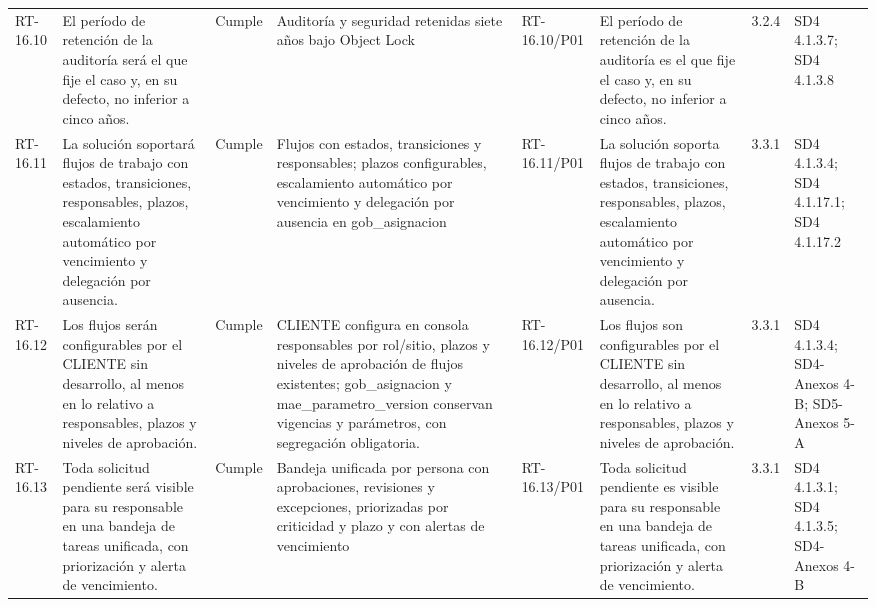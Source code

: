 \documentclass[oficio,firma,final]{lafrox}
\begin{document}
\begin{landscape}
{\begin{longtable}{@{}F{0.054} F{0.173} F{0.061} F{0.191} F{0.106} F{0.180} F{0.067} F{0.168}@{}}
  RT-16.10 & El período de retención de la auditoría será el que fije el caso y, en su defecto, no inferior a cinco años. & Cumple & Auditoría y seguridad retenidas siete años bajo Object Lock & RT-16.10/\allowbreak{}P01 & El período de retención de la auditoría es el que fije el caso y, en su defecto, no inferior a cinco años. & 3.2.4 & SD4 4.1.3.7; SD4 4.1.3.8  \\
  RT-16.11 & La solución soportará flujos de trabajo con estados, transiciones, responsables, plazos, escalamiento automático por vencimiento y delegación por ausencia. & Cumple & Flujos con estados, transiciones y responsables; plazos configurables, escalamiento automático por vencimiento y delegación por ausencia en gob\_asignacion & RT-16.11/\allowbreak{}P01 & La solución soporta flujos de trabajo con estados, transiciones, responsables, plazos, escalamiento automático por vencimiento y delegación por ausencia. & 3.3.1 & SD4 4.1.3.4; SD4 4.1.17.1; SD4 4.1.17.2  \\
  RT-16.12 & Los flujos serán configurables por el CLIENTE sin desarrollo, al menos en lo relativo a responsables, plazos y niveles de aprobación. & Cumple & CLIENTE configura en consola responsables por rol/sitio, plazos y niveles de aprobación de flujos existentes; gob\_asignacion y mae\_parametro\_version conservan vigencias y parámetros, con segregación obligatoria. & RT-16.12/\allowbreak{}P01 & Los flujos son configurables por el CLIENTE sin desarrollo, al menos en lo relativo a responsables, plazos y niveles de aprobación. & 3.3.1 & SD4 4.1.3.4; SD4-Anexos 4-B; SD5-Anexos 5-A  \\
  RT-16.13 & Toda solicitud pendiente será visible para su responsable en una bandeja de tareas unificada, con priorización y alerta de vencimiento. & Cumple & Bandeja unificada por persona con aprobaciones, revisiones y excepciones, priorizadas por criticidad y plazo y con alertas de vencimiento & RT-16.13/\allowbreak{}P01 & Toda solicitud pendiente es visible para su responsable en una bandeja de tareas unificada, con priorización y alerta de vencimiento. & 3.3.1 & SD4 4.1.3.1; SD4 4.1.3.5; SD4-Anexos 4-B  \\

\end{longtable}}
\end{landscape}
\end{document}
